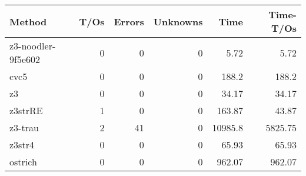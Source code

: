 \begin{tabular}{lrrrrr}
\hline
 Method             &   T/Os &   Errors &   Unknowns &     Time &   Time-T/Os \\
\hline
 z3-noodler-9f5e602 &      0 &        0 &          0 &     5.72 &        5.72 \\
 cvc5               &      0 &        0 &          0 &   188.2  &      188.2  \\
 z3                 &      0 &        0 &          0 &    34.17 &       34.17 \\
 z3strRE            &      1 &        0 &          0 &   163.87 &       43.87 \\
 z3-trau            &      2 &       41 &          0 & 10985.8  &     5825.75 \\
 z3str4             &      0 &        0 &          0 &    65.93 &       65.93 \\
 ostrich            &      0 &        0 &          0 &   962.07 &      962.07 \\
\hline
\end{tabular}
